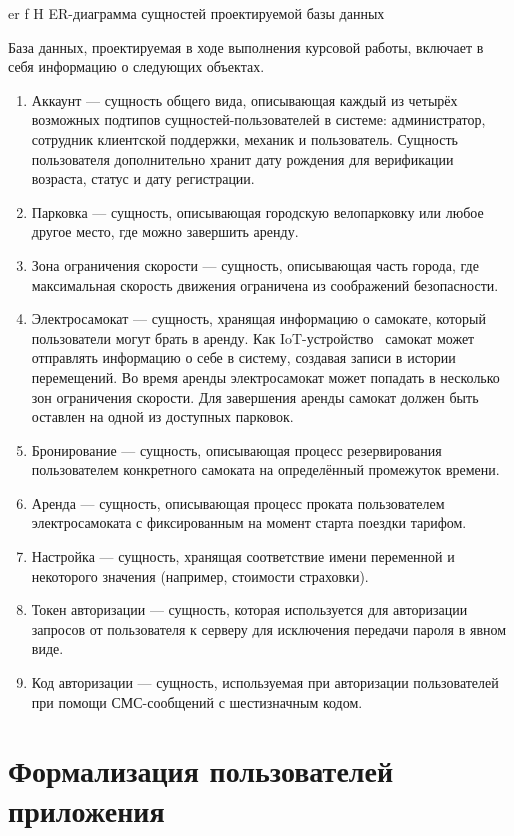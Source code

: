     {er}
    {f}
    {H}
    {\textwidth}
    {ER-диаграмма сущностей проектируемой базы данных}

База данных, проектируемая в ходе выполнения курсовой работы, включает в себя информацию о следующих объектах.

\begin{enumerate}
    \item Аккаунт --- сущность общего вида, описывающая каждый из четырёх возможных подтипов сущностей-пользователей в системе: администратор, сотрудник клиентской поддержки, механик и пользователь. Сущность пользователя дополнительно хранит дату рождения для верификации возраста, статус и дату регистрации.
    \item Парковка --- сущность, описывающая городскую велопарковку или любое другое место, где можно завершить аренду.
    \item Зона ограничения скорости --- сущность, описывающая часть города, где максимальная скорость движения ограничена из соображений безопасности.
    \item Электросамокат --- сущность, хранящая информацию о самокате, который пользователи могут брать в аренду. Как IoT-устройство~\cite{iot} самокат может отправлять информацию о себе в систему, создавая записи в истории перемещений. Во время аренды электросамокат может попадать в несколько зон ограничения скорости. Для завершения аренды самокат должен быть оставлен на одной из доступных парковок.
    \item Бронирование --- сущность, описывающая процесс резервирования пользователем конкретного самоката на определённый промежуток времени.
    \item Аренда --- сущность, описывающая процесс проката пользователем электросамоката с фиксированным на момент старта поездки тарифом.
    \item Настройка --- сущность, хранящая соответствие имени переменной и некоторого значения (например, стоимости страховки).
    \item Токен авторизации --- сущность, которая используется для авторизации запросов от пользователя к серверу для исключения передачи пароля в явном виде.
    \item Код авторизации --- сущность, используемая при авторизации пользователей при помощи СМС-сообщений с шестизначным кодом.
\end{enumerate}

\section{Формализация пользователей приложения}

